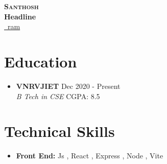 \documentclass[letterpaper,5pt]{article}
\begin{document}
    
    \begin{center}
      \textbf{\Huge \scshape Santhosh} \\ \vspace{5pt}
      \textbf{\large Headline} \\ \vspace{2pt}
      \href{mailto:ram}{\raisebox{-0.05\height}\faEnvelope \ ram} 
       \
       \
       \
    \end{center}
    
      
    
    \section{Education}
      
      
        \begin{itemize}
        \item
          \textbf{ VNRVJIET } \hfill Dec 2020 - Present \\
          \textit{ B Tech in CSE } \hfill CGPA: 8.5 
        \end{itemize}
        \vspace{-15pt}
      
      \vspace{10mm}
    
    \vspace*{-10.5mm}  

    
    
    \section{Technical Skills}
    \begin{itemize}[leftmargin=0.15in,label={}]
    \item{
      
        \textbf{Front End: }
        \textbullet{} Js ,\textbullet{} React ,\textbullet{} Express ,\textbullet{} Node ,\textbullet{} Vite 
      
    }
          
    \end{itemize}
    \vspace*{-6mm}  
    
\end{document}
